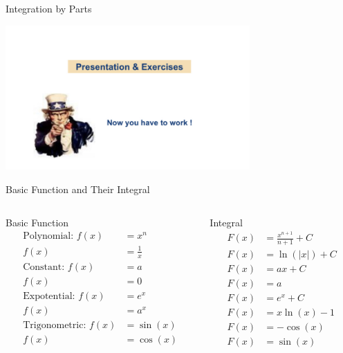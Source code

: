 \documentclass[10pt, aspectratio=1610]{beamer}
\begin{document}
\begin{frame}{Integration by Parts}\vspace{4pt}
  \begin{center}
    \includegraphics[width=0.7\textwidth]{image3.png}
  \end{center}
\end{frame}
\appendix
 \begin{frame}{Basic Function and Their Integral}\label{slide:2}
  \begin{columns}
    \begin{column}{0.5\textwidth}
      \begin{block}{Basic Function \hfill \hyperlink{slide:5}{}}
        \begin{align*}
          \text{Polynomial}:\,f(x) &= x^{n}\\
          f(x) &= \frac{1}{x}\\
          \text{Constant}:\, f(x) &=a\\
          f(x) &=0\\
          \text{Expotential}:\, f(x) &= e^{x}\\
          f(x) &=a^{x}\\
          \text{Trigonometric}:\, f(x) &=\sin{(x)}\\
          f(x) &=\cos{(x)}
        \end{align*}
      \end{block}
    \end{column}
 
    \begin{column}{0.5\textwidth}
      \begin{block}{Integral \hfill \hyperlink{slide:3}{}}
        \begin{align*}
          F(x) &= \frac{x^{n+1}}{n+1}+C\\
          F(x) &= \ln{(\lvert x \rvert)}+C\\
          F(x) &=ax+C\\
          F(x) &=a\\
          F(x) &= e^{x}+C\\
          F(x) &= x\ln{(x)-1}\\
          F(x) &=-\cos{(x)}\\
          F(x) &= \sin{(x)}
        \end{align*}
      \end{block}
    \end{column}
  \end{columns}
\end{frame}
\end{document}
